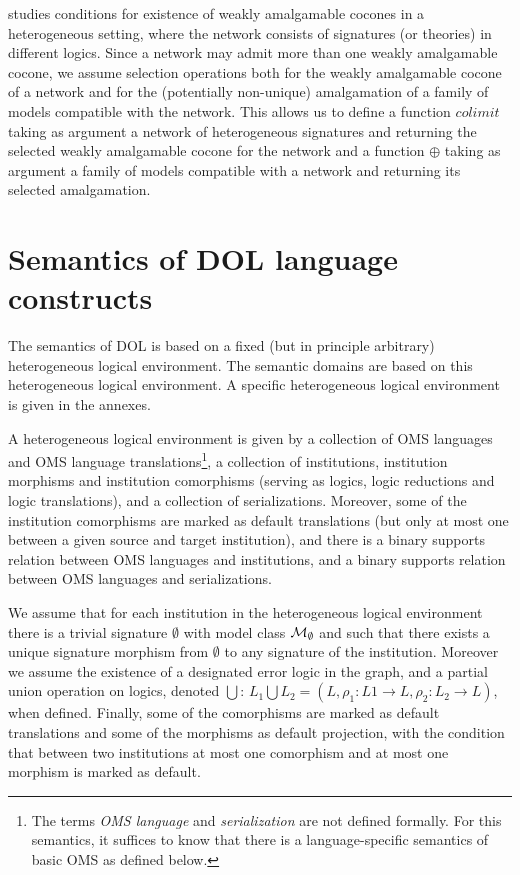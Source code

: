 \documentclass[10pt,fleqn,%
\ifpretendfinal
final%
\else
draft%
\fi,
]{scrreprt}
\newcommand*{\termref}[1]{\index{#1}#1\xspace}
\newcommand{\sclause}[1]{\section{#1}}
\begin{document}
\cite{weakcol} studies conditions for existence of weakly amalgamable cocones
in a heterogeneous setting, where the network consists of signatures (or theories)
in different logics. Since a network may admit more than one weakly amalgamable cocone,
we assume selection operations both for the weakly amalgamable cocone of a network 
and for the (potentially non-unique) amalgamation of a family of models compatible with the
network. This allows us to define a function
$colimit$ taking as argument a network of heterogeneous signatures and
returning the selected weakly amalgamable cocone for the network and
a function $\oplus$ taking as argument a family of models compatible with a network
and returning its selected amalgamation.


\sclause{Semantics of DOL language constructs}\label{c:direct-sematics}

The semantics of DOL is based on a fixed (but in principle arbitrary) heterogeneous logical 
environment.  The semantic domains are based on this heterogeneous logical environment. 
A specific heterogeneous logical environment is given in the annexes.

A heterogeneous logical environment is given by a collection of
OMS languages and OMS language translations\footnote{The
  terms \emph{OMS language} and \emph{serialization} are not
  defined formally. For this semantics, it suffices to know that there
  is a language-specific semantics of basic OMS as defined
  below.}, a collection of institutions, \termref{institution} morphisms and
institution comorphisms (serving as logics, logic reductions and logic
translations), and a collection of serializations. Moreover, some of the institution comorphisms are marked as default translations (but only at most one between a given source and target institution), and there is
a binary supports relation between OMS languages and institutions,
and a binary supports relation between OMS languages and
serializations. 

We assume that for each institution in the heterogeneous logical environment there is a trivial signature
$\emptyset$ with model class ${\cal M}_\emptyset$ and such that there exists a unique signature morphism
from $\emptyset$ to any signature of the institution. Moreover we assume the existence of a designated 
error logic in the graph, and a partial union operation on logics, denoted $\bigcup$: 
$L_1 \bigcup L_2 = (L, \rho_1:L1 \to L, \rho_2 : L_2 \to L)$, when defined. Finally, some of the comorphisms are marked as default translations and some of the morphisms as default projection, with the condition that between two institutions at most one comorphism 
and at most one morphism is marked as default.
\end{document}
